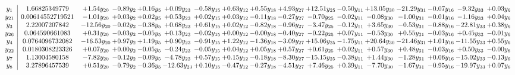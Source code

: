 \documentclass[9pt]{article}
\begin{document}
\[\begin{array}{c| c c@{\hskip 2pt} c@{\hskip 2pt} c@{\hskip 2pt} c@{\hskip 2pt} c@{\hskip 2pt} c@{\hskip 2pt} c@{\hskip 2pt} c@{\hskip 2pt} c@{\hskip 2pt} c@{\hskip 2pt} c@{\hskip 2pt} c@{\hskip 2pt} c@{\hskip 2pt} c@{\hskip 2pt} c@{\hskip 2pt} }
 y_{1}   &  1.66825349779 & +  1.54 y_{20} & -0.89 y_{2} & +  0.16 y_{5} & +  0.09 y_{23} & -0.58 y_{15} & +  0.63 y_{12} & +  0.55 y_{18} & +  4.93 y_{27} & + 12.51 y_{25} & -0.50 y_{11} & + 13.05 y_{30} & -21.29 y_{31} & -0.07 y_{16} & -9.32 y_{33} & +  0.03 y_{6}\\
 y_{21}   &  0.00614552719521 & -1.01 y_{20} & +  0.03 y_{2} & +  0.02 y_{5} & +  0.53 y_{23} & +  0.02 y_{15} & +  0.03 y_{12} & -0.11 y_{18} & -0.27 y_{27} & -0.70 y_{25} & -0.02 y_{11} & -0.08 y_{30} & -1.00 y_{31} & -0.01 y_{16} & -1.16 y_{33} & +  0.04 y_{6}\\
 y_{3}   &  2.22007207842 & -12.56 y_{20} & -0.02 y_{2} & -0.38 y_{5} & +  0.68 y_{23} & +  0.61 y_{15} & +  0.02 y_{12} & -0.82 y_{18} & -0.96 y_{27} & -3.47 y_{25} & -0.12 y_{11} & +  3.65 y_{30} & -0.53 y_{31} & -0.88 y_{16} & -22.81 y_{33} & +  0.38 y_{6}\\
 y_{26}   &  0.064590661083 & +  0.31 y_{20} & -0.03 y_{2} & -0.05 y_{5} & +  0.13 y_{23} & -0.02 y_{15} & +  0.00 y_{12} & -0.00 y_{18} & -0.40 y_{27} & -0.22 y_{25} & +  0.07 y_{11} & -0.53 y_{30} & +  0.55 y_{31} & -0.03 y_{16} & +  0.45 y_{33} & -0.01 y_{6}\\
 y_{4}   &  0.0764096732082 & -16.53 y_{20} & +  0.97 y_{2} & +  1.19 y_{5} & +  0.90 y_{23} & -0.91 y_{15} & +  1.22 y_{12} & -1.36 y_{18} & -3.09 y_{27} & + 15.06 y_{25} & -1.75 y_{11} & + 20.64 y_{30} & -21.46 y_{31} & +  1.01 y_{16} & -11.55 y_{33} & +  0.55 y_{6}\\
 y_{22}   &  0.0180308223326 & +  0.07 y_{20} & +  0.00 y_{2} & -0.05 y_{5} & -0.24 y_{23} & -0.05 y_{15} & +  0.04 y_{12} & +  0.05 y_{18} & +  0.57 y_{27} & +  0.61 y_{25} & +  0.02 y_{11} & +  0.57 y_{30} & +  0.48 y_{31} & -0.03 y_{16} & +  0.50 y_{33} & -0.00 y_{6}\\
 y_{7}   &  1.13004580158 & -7.82 y_{20} & -0.12 y_{2} & -0.09 y_{5} & -4.78 y_{23} & +  0.57 y_{15} & +  0.15 y_{12} & -0.18 y_{18} & -8.30 y_{27} & -15.15 y_{25} & -0.38 y_{11} & +  1.44 y_{30} & -1.28 y_{31} & +  0.06 y_{16} & -15.02 y_{33} & -0.13 y_{6}\\
 y_{8}   &  3.27896457539 & +  0.51 y_{20} & -0.79 y_{2} & -0.36 y_{5} & -12.63 y_{23} & +  0.10 y_{15} & -0.47 y_{12} & -0.27 y_{18} & -4.51 y_{27} & +  7.46 y_{25} & +  0.39 y_{11} & -7.70 y_{30} & -1.67 y_{31} & -0.95 y_{16} & -19.97 y_{33} & +  0.07 y_{6}\\

\end{array}\]
\end{document}
